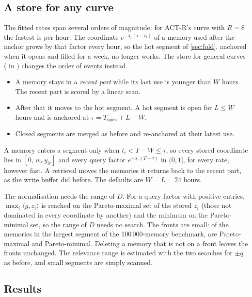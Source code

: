 \subsection{A store for any curve}

The fitted rates span several orders of magnitude: for ACT-R's curve with $R=8$ the fastest is \CfFastRate{} per hour. The coordinate $e^{-\lambda_r(\tau-t_i)}$ of a memory used after the anchor grows by that factor every hour, so the hot segment of \cref{sec:fold}, anchored when it opens and filled for a week, no longer works. The store for general curves ( in ) changes the order of events instead.
\begin{itemize}
\item A memory stays in a \emph{recent part} while its last use is younger than $W$ hours. The recent part is scored by a linear scan.
\item After that it moves to the hot segment. A hot segment is open for $L\le W$ hours and is anchored at $\tau=T_{\mathrm{open}}+L-W$.
\item Closed segments are merged as before and re-anchored at their latest use.
\end{itemize}
A memory enters a segment only when $t_i<T-W\le\tau$, so every stored coordinate lies in $[0,\,w_r\,y_{ir}]$ and every query factor $e^{-\lambda_r(T-\tau)}$ in $(0,1]$, for every rate, however fast. A retrieval moves the memories it returns back to the recent part, as the write buffer did before. The defaults are $W=L=24$ hours.

The normalisation needs the range of $D$. For a query factor with positive entries, $\max_i\langle g,z_i\rangle$ is reached on the Pareto-maximal set of the stored $z_i$ (those not dominated in every coordinate by another) and the minimum on the Pareto-minimal set, so the range of $D$ needs no search. The fronts are small: of the \CuSegN{} memories in the largest segment of the 100\,000-memory benchmark, \CuFrontMax{} are Pareto-maximal and \CuFrontMin{} Pareto-minimal. Deleting a memory that is not on a front leaves the fronts unchanged. The relevance range is estimated with the two searches for $\pm q$ as before, and small segments are simply scanned.

\subsection{Results}

